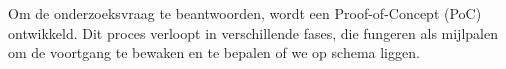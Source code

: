 
\chapter{}%
\label{ch:methodologie}


Om de onderzoeksvraag te beantwoorden, wordt een Proof-of-Concept (PoC) ontwikkeld. Dit proces verloopt in verschillende fases, die fungeren als mijlpalen om de voortgang te bewaken en te bepalen of we op schema liggen.


